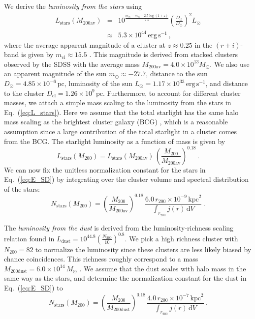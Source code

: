 \documentclass[10pt,aps,pra,reprint,amsmath,amsfonts,amssymb,showpacs,nofootinbib,floatfix]{revtex4-1}
\newcommand{\rmn}{\mathrm}
\newcommand{\clu}{\rmn{cl}}
\newcommand{\msun}{M_\odot}
\newcommand{\stars}{\rmn{stars}}
\newcommand{\dust}{\rmn{dust}}
\newcommand{\kpc}{\rmn{kpc}}
\newcommand{\dd}{\rmn{d}}
\newcommand{\rvir}{r_{200}}
\newcommand{\mvir}{M_{200}}
\begin{document}
We derive the {\em luminosity from the stars} using
\begin{eqnarray}
L_\stars(M_{200\rmn{av}})&=&10^{\frac{m_\odot-m_\rmn{cl}-2.5\log\left(1+z\right)}{2.5}}
\left(\frac{D_\clu}{D_\odot}\right)^2 L_\odot\nonumber\\
&\approx& 5.3\times10^{44}\,\rmn{erg}\,\rmn{s}^{-1}\,,
\label{eq:L_stars}
\end{eqnarray}
where the average apparent magnitude of a cluster at $z\approx 0.25$
in the $(r+i)$-band is given by $m_\rmn{cl}\approx 15.5$
\cite{2005MNRAS.358..949Z}. This magnitude is derived from stacked
clusters observed by the SDSS with the average mass
$M_{200\rmn{av}}=4.0\times10^{13}\msun$. We also use an apparent
magnitude of the sun $m_\odot\approx -27.7$, distance to the sun
$D_\odot=4.85\times10^{-6}\,\rmn{pc}$, luminosity of the sun
$L_\odot=1.17\times10^{33}\,\rmn{erg\,s}^{-1}$, and distance to the
cluster $D_\clu=1.26\times10^9\,\rmn{pc}$. Furthermore, to account for
different cluster masses, we attach a simple mass scaling to the
luminosity from the stars in Eq.~(\ref{eq:L_stars}). Here we assume
that the total starlight has the same halo mass scaling as the
brightest cluster galaxy (BCG) \cite{2010ApJ...713.1037H}, which is a
reasonable assumption since a large contribution of the total
starlight in a cluster comes from the BCG. The starlight luminosity as
a function of mass is given by
\begin{equation}
L_\stars(\mvir)=L_\stars(M_{200\rmn{av}})\,
\left(\frac{\mvir}{M_{200\rmn{av}}}\right)^{0.18}\,.
\label{eq:L_stars_m}
\end{equation} 
We can now fix the unitless normalization constant for the stars in
Eq.~(\ref{eq:E_SD}) by integrating over the cluster volume and
spectral distribution of the stars:
\begin{equation}
 N_\stars(\mvir) = 
\left(\frac{\mvir}{M_{200\rmn{av}}}\right)^{0.18}\,
\frac{6.0\,\rvir\times10^{-9}\,\kpc^2}{\int_{\rvir} j(r) \,\dd V}\,.
\label{eq:N_stars}
\end{equation}

The {\em luminosity from the dust} is derived from the
luminosity-richness scaling relation found in
\cite{2008A&A...490..547G}
$L_\dust=10^{44.8}\left(\frac{N_{200}}{10}\right)^{0.8}$. We pick a
high richness cluster with $N_{200}=82$ to normalize the luminosity
since these clusters are less likely biased by chance
coincidences. This richness roughly correspond to a mass
$M_\rmn{200dust}=6.0\times10^{14}\,\msun$
\cite{2010ApJ...713.1037H}. We assume that the dust scales with halo
mass in the same way as the stars, and determine the normalization
constant for the dust in Eq.~(\ref{eq:E_SD}) to
\begin{equation}
 N_\stars(\mvir) = 
\left(\frac{\mvir}{M_\rmn{200dust}}\right)^{0.18}\,
\frac{4.0\,\rvir\times10^{-7}\,\kpc^2}{\int_{\rvir} j(r) \,\dd V}\,.
\label{eq:N_dust}
\end{equation}
\end{document}
